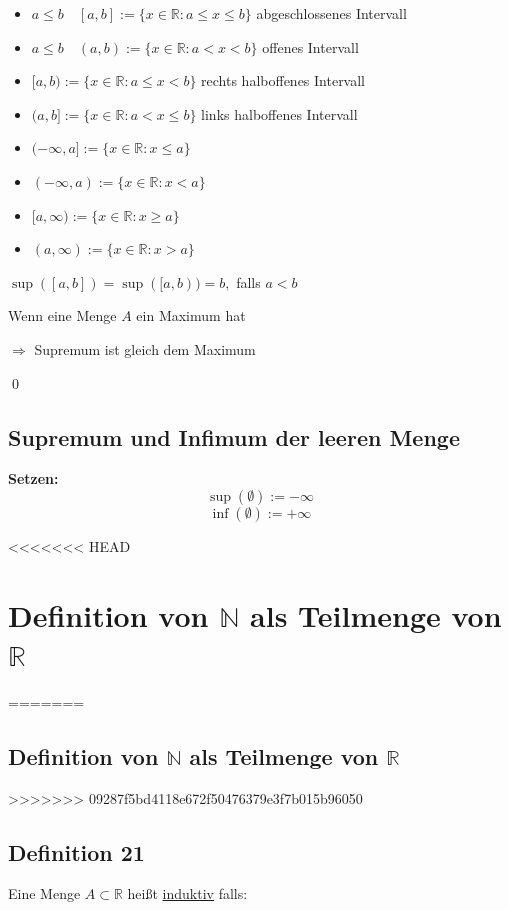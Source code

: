 \documentclass[fleqn]{scrbook}
\renewenvironment{proof}{{\bfseries Beweis }}{\qed}
\begin{document}
\begin{itemize}
  \item $a \leq b \quad [a,b] := \{x \in \mathbb{R}:a \leq x \leq b\}$ abgeschlossenes Intervall
  \item $a \leq b \quad (a,b) := \{x \in \mathbb{R}:a < x < b\}$ offenes Intervall
  \item $[a,b) := \{x \in \mathbb{R}:a \leq x < b\}$ rechts halboffenes Intervall
  \item $(a,b]:= \{x \in \mathbb{R}:a < x \leq b\}$ links halboffenes Intervall
  \item $(-\infty,a]:= \{x \in \mathbb{R}:x \leq a\}$
  \item $(-\infty,a):= \{x \in \mathbb{R}:x < a\}$
  \item $[a,\infty):= \{x \in \mathbb{R}:x \geq a\}$
  \item $(a,\infty):= \{x \in \mathbb{R}:x > a\}$
\end{itemize}

\begin{proof}
$\sup([a,b])=\sup([a,b)) = b,$ falls $a<b \quad $

Wenn eine Menge $A$ ein Maximum hat 

$\Longrightarrow$ Supremum ist gleich dem Maximum

\end{proof}

\subsection{Supremum und Infimum der leeren Menge}
\textbf{Setzen:}
\[\sup(\emptyset):=-\infty\]
\[\inf(\emptyset):=+\infty\]

<<<<<<< HEAD
\section{Definition von $\mathbb{N}$ als Teilmenge von $\mathbb{R}$}
=======
\subsection{Definition von \texorpdfstring{$\mathbb{N}$}{N} als Teilmenge von \texorpdfstring{$\mathbb{R}$}{R}}
>>>>>>> 09287f5bd4118e672f50476379e3f7b015b96050

\subsection{Definition 21}

Eine Menge $A \subset \mathbb{R}$ heißt \underline{induktiv} falls:
\end{document}
